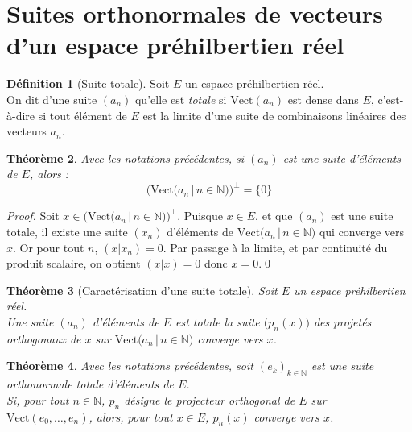 \documentclass[11pt,a4paper]{report}
\newtheorem{theorem}{Théorème}[chapter]
\newtheorem{itheorem}[theorem]{Théorème}
\theoremstyle{definition}
\newtheorem{dfn}[theorem]{Définition}
\begin{document}
\section{Suites orthonormales de vecteurs d'un espace préhilbertien réel} %
\label{sec:suites_orthonormales_de_vecteurs_d_un_espace_prehilbertien_reel}
\begin{dfn}[Suite totale]
     Soit $E$ un espace préhilbertien réel. \\
     On dit d'une suite $(a_n)$ qu'elle est \emph{totale} si $\mathrm{Vect}(a_n)$ est dense dans $E$, c'est-à-dire si tout élément de $E$ est la limite d'une suite de combinaisons linéaires des vecteurs $a_n$.
\end{dfn}
\begin{theorem}
     Avec les notations précédentes, si $(a_n)$ est une suite d'éléments de $E$, alors : 
     \begin{equation}
     \Big( \mathrm{Vect}\big(a_n\, | \, n\in \mathbb{N}\big)\Big)^{\perp} = \{ 0\}
     \end{equation}
\end{theorem}
\begin{proof}
     Soit $x \in \Big( \mathrm{Vect}\big(a_n\, | \, n\in \mathbb{N}\big)\Big)^{\perp}$. \newline
     Puisque $x\in E$, et que $(a_n)$ est une suite totale, il existe une suite $(x_n)$ d'éléments de $\mathrm{Vect}\big(a_n\, | \, n\in \mathbb{N}\big)$ qui converge vers $x$. Or pour tout $n$, $(x | x_n) = 0$.\newline
     Par passage à la limite, et par continuité du produit scalaire, on obtient $(x | x) = 0$ donc $x=0$.\qed
\end{proof}
\begin{itheorem}[Caractérisation d'une suite totale]
     Soit $E$ un espace préhilbertien réel.\\
     Une suite $(a_n)$ d'éléments de $E$ est totale \Longleftrightarrow la suite $\big(p_n(x)\big)$ des projetés orthogonaux de $x$ sur $\mathrm{Vect}\big(a_n\, | \, n\in \mathbb{N}\big)$ converge vers $x$.
\end{itheorem}
\begin{theorem}
     Avec les notations précédentes, soit $(e_k)_{k\in \mathbb{N}}$ est une suite orthonormale totale d'éléments de $E$.\\
     Si, pour tout $n \in \mathbb{N}$, $p_n$ désigne le projecteur orthogonal de $E$ sur $\mathrm{Vect}(e_0, \ldots , e_n) $, alors, pour tout $x \in E$, $p_n(x)$ converge vers $x$.
\end{theorem}
\end{document}
